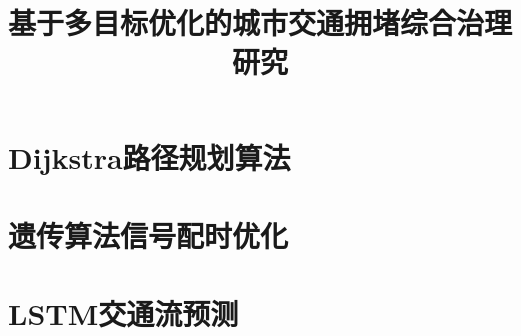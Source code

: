 \documentclass[withoutpreface,bwprint]{cumcmthesis}
\title{基于多目标优化的城市交通拥堵综合治理研究}
\begin{document}
\maketitle



\newpage
\appendix

\section{Dijkstra路径规划算法}


\section{遗传算法信号配时优化}


\section{LSTM交通流预测}

\end{document}
